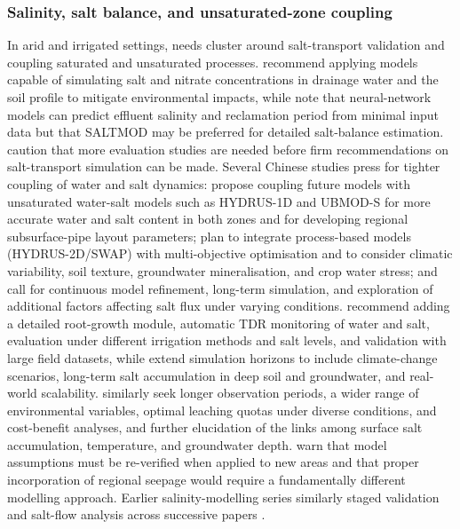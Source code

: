 \subsubsection{Salinity, salt balance, and unsaturated-zone coupling}

In arid and irrigated settings, needs cluster around salt-transport validation and
coupling saturated and unsaturated processes. \textcite{Ebrahimian2015} recommend
applying models capable of simulating salt and nitrate concentrations in drainage
water and the soil profile to mitigate environmental impacts, while
\textcite{Sarangi2006} note that neural-network models can predict effluent
salinity and reclamation period from minimal input data but that SALTMOD may be
preferred for detailed salt-balance estimation. \textcite{Hirekhan2007} caution
that more evaluation studies are needed before firm recommendations on salt-transport
simulation can be made. Several Chinese studies press for tighter coupling of
water and salt dynamics: \textcite{Han2025} propose coupling future models with
unsaturated water-salt models such as HYDRUS-1D and UBMOD-S for more accurate
water and salt content in both zones and for developing regional subsurface-pipe
layout parameters; \textcite{Wang2025c} plan to integrate process-based models
(HYDRUS-2D/SWAP) with multi-objective optimisation and to consider climatic
variability, soil texture, groundwater mineralisation, and crop water stress; and
\textcite{Wang2024c} call for continuous model refinement, long-term simulation,
and exploration of additional factors affecting salt flux under varying
conditions. \textcite{Liu2022} recommend adding a detailed root-growth module,
automatic TDR monitoring of water and salt, evaluation under different irrigation
methods and salt levels, and validation with large field datasets, while
\textcite{Liu2026} extend simulation horizons to include climate-change scenarios,
long-term salt accumulation in deep soil and groundwater, and real-world
scalability. \textcite{Guo2025} similarly seek longer observation periods, a wider
range of environmental variables, optimal leaching quotas under diverse
conditions, and cost-benefit analyses, and further elucidation of the links among
surface salt accumulation, temperature, and groundwater depth. \textcite{Kelleners2000}
warn that model assumptions must be re-verified when applied to new areas and that
proper incorporation of regional seepage would require a fundamentally different
modelling approach. Earlier salinity-modelling series similarly staged validation
and salt-flow analysis across successive papers \parencite{KARAJEH1994}.

